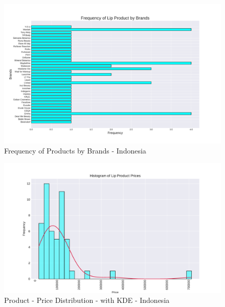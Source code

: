 \documentclass{article}
\begin{document}
\begin{center}
    \begin{figure}[htbp]
        \centering
        \includegraphics[scale=0.5]{../images/Indonesia-graphs/Brand_Frequency.pdf}
        \caption{Frequency of Products by Brands - Indonesia}
        \label{Products_by_Brands}
    \end{figure}

    \begin{figure}[htbp]
        \centering
        \includegraphics[scale=0.6]{../images/Indonesia-graphs/KDE_Prices.pdf}
        \caption{Product - Price Distribution - with KDE - Indonesia}
        \label{KDE_Prices}
    \end{figure}


\end{center}
\end{document}
